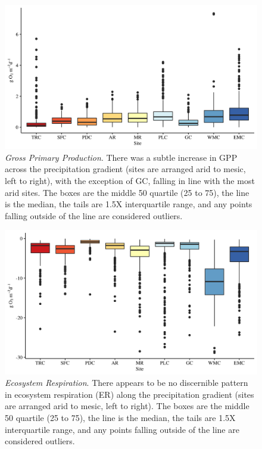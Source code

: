 \begin{figure}[htb]
\begin{center}
\includegraphics[scale=0.2]{Figs/GPPBox.png}
\caption[Gross Primary Production]{\textit{Gross Primary Production}. There was a subtle increase in GPP across the precipitation gradient (sites are arranged arid to mesic, left to right), with the exception of GC, falling in line with the most arid sites. The boxes are the middle 50 quartile (25 to 75), the line is the median, the tails are 1.5X interquartile range, and any points falling outside of the line are considered outliers.}
\label{fig:GPPBox}
\end{center}
\end{figure}

\begin{figure}[htb]
\begin{center}
\includegraphics[scale=0.2]{Figs/ERBox.png}
\caption[Ecosystem Respiration]{\textit{Ecosystem Respiration}. There appears to be no discernible pattern in ecosystem respiration (ER) along the precipitation gradient (sites are arranged arid to mesic, left to right). The boxes are the middle 50 quartile (25 to 75), the line is the median, the tails are 1.5X interquartile range, and any points falling outside of the line are considered outliers.}
\label{fig:ERBox}
\end{center}
\end{figure}

